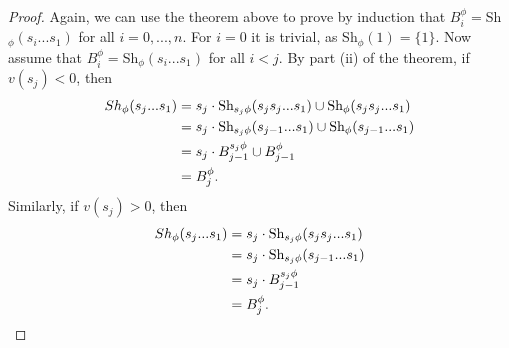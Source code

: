 \documentclass[11pt]{article}
\begin{document}
\begin{proof}
    Again, we can use the theorem above to prove by induction that $B^\phi_i=$Sh$_\phi(s_i...s_1)$ for all $i=0,...,n$. For $i=0$ it is trivial, as Sh$_\phi(1)=\{1\}$. Now assume that $B^\phi_i=$Sh$_\phi(s_i...s_1)$ for all $i<j$. By part (ii) of the theorem, if $v(s_j)<0$, then
    \[\begin{aligned}
        Sh_\phi(s_j...s_1)&=s_j\cdot \textnormal{Sh}_{s_j\phi}(s_js_j...s_1)\cup \textnormal{Sh}_\phi(s_js_j...s_1)\\
                        &=  s_j\cdot \textnormal{Sh}_{s_j\phi}(s_{j-1}...s_1)\cup \textnormal{Sh}_\phi(s_{j-1}...s_1)\\
                        &= s_j\cdot B^{s_j\phi}_{j-1}\cup B^{\phi}_{j-1}\\
                        &= B^\phi_j. 
    \end{aligned}\]
    Similarly, if $v(s_j)>0$, then
    \[\begin{aligned}
        Sh_\phi(s_j...s_1)& = s_j\cdot \textnormal{Sh}_{s_j\phi}(s_js_j...s_1)\\
                        & = s_j\cdot \textnormal{Sh}_{s_j\phi}(s_{j-1}...s_1)\\
                        & = s_j \cdot B^{s_j\phi}_{j-1}\\
                        & = B^{\phi}_{j}. 
    \end{aligned}\]
\end{proof}



\newpage

\nocite{*}

\end{document}
